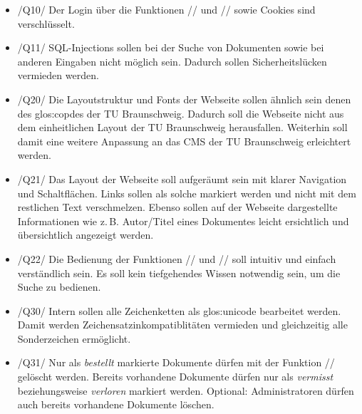 \begin{itemize}

\item  /Q10/ Der Login über die Funktionen // und // sowie Cookies sind verschlüsselt.
\item  /Q11/ SQL-Injections sollen bei der Suche von Dokumenten sowie bei anderen Eingaben nicht möglich sein. Dadurch sollen Sicherheitslücken vermieden werden.
\item  /Q20/ Die Layoutstruktur und Fonts der Webseite sollen ähnlich sein denen des \Gls{glos:copdes} der TU Braunschweig. Dadurch soll die Webseite nicht aus dem einheitlichen Layout der TU Braunschweig herausfallen. Weiterhin soll damit eine weitere Anpassung an das CMS der TU Braunschweig erleichtert werden.
\item  /Q21/ Das Layout der Webseite soll aufgeräumt sein mit klarer Navigation und Schaltflächen. Links sollen als solche markiert werden und nicht mit dem restlichen Text verschmelzen. Ebenso sollen auf der Webseite dargestellte Informationen wie \mbox{z.\,B.}\xspace Autor/Titel eines Dokumentes leicht ersichtlich und übersichtlich angezeigt werden.
\item  /Q22/ Die Bedienung der Funktionen // und // soll intuitiv und einfach verständlich sein. Es soll kein tiefgehendes Wissen notwendig sein, um die Suche zu bedienen.
\item  /Q30/ Intern sollen alle Zeichenketten als \Gls{glos:unicode} bearbeitet werden. Damit werden Zeichensatzinkompatiblitäten vermieden und gleichzeitig alle Sonderzeichen ermöglicht.
\item  /Q31/ Nur als \emph{bestellt} markierte Dokumente dürfen mit der Funktion // gelöscht werden. Bereits vorhandene Dokumente dürfen nur als \emph{vermisst} beziehungsweise \emph{verloren} markiert werden. Optional: Administratoren dürfen auch bereits vorhandene Dokumente löschen.

\end{itemize} 